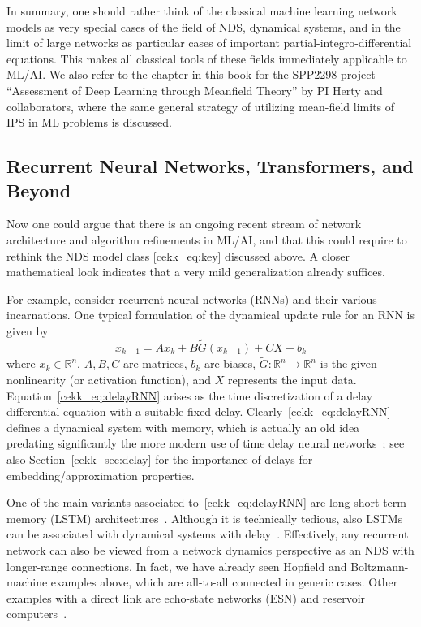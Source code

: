 \documentclass[10pt]{article}
\newcommand{\R}{{\mathbb R}}
\def\R{\mathbb{R}}
\newcommand{\be}{\begin{equation}}
\newcommand{\ee}{\end{equation}}
\begin{document}
In summary, one should rather think of the classical machine learning network models as very special cases of the field of NDS, dynamical systems, and in the limit of large networks as particular cases of important partial-integro-differential equations. This makes all classical tools of these fields immediately applicable to ML/AI. We also refer to the chapter in this book for the SPP2298 project ``Assessment of Deep Learning through Meanfield Theory'' by PI Herty and collaborators, where the same general strategy of utilizing mean-field limits of IPS in ML problems is discussed. 

\subsection{Recurrent Neural Networks, Transformers, and Beyond}
\label{cekk_sec:RNNs}
Now one could argue that there is an ongoing recent stream of network architecture and algorithm refinements in ML/AI, and that this could require to rethink the NDS model class \eqref{cekk_eq:key} discussed above.
A closer mathematical look indicates that a very mild generalization already suffices. 

For example, consider recurrent neural networks (RNNs) and their various incarnations. One typical formulation of the dynamical update rule for an RNN is given by
\be
\label{cekk_eq:delayRNN}
x_{k+1}= Ax_k + B \tilde{G}(x_{k-1})+CX + b_k  
\ee
where $x_k\in\R^n$, $A,B,C$ are matrices, $b_k$ are biases, $\tilde{G}:\R^n\rightarrow\R^n$ is the given nonlinearity (or activation function), and $X$ represents the input data. Equation~\eqref{cekk_eq:delayRNN} arises as the time discretization of a delay differential equation with a suitable fixed delay. Clearly~\eqref{cekk_eq:delayRNN} defines a dynamical system with memory, which is actually an old idea~\cite{Roberts3,Anderson2} predating significantly the more modern use of time delay neural networks~\cite{Waibel}; see also Section~\ref{cekk_sec:delay} for the importance of delays for embedding/approximation properties. 

One of the main variants associated to~\eqref{cekk_eq:delayRNN} are long short-term memory (LSTM) architectures~\cite{HochreiterSchmidhuber}. Although it is technically tedious, also LSTMs can be associated with dynamical systems with delay~\cite{Sherstinsky}. Effectively, any recurrent network can also be viewed from a network dynamics perspective as an NDS with longer-range connections. In fact, we have already seen Hopfield and Boltzmann-machine examples above, which are all-to-all connected in generic cases. Other examples with a direct link are echo-state networks (ESN) and reservoir computers~\cite{Jaeger,OzturkXuPrincipe,Appeltantetal}. 
\end{document}
